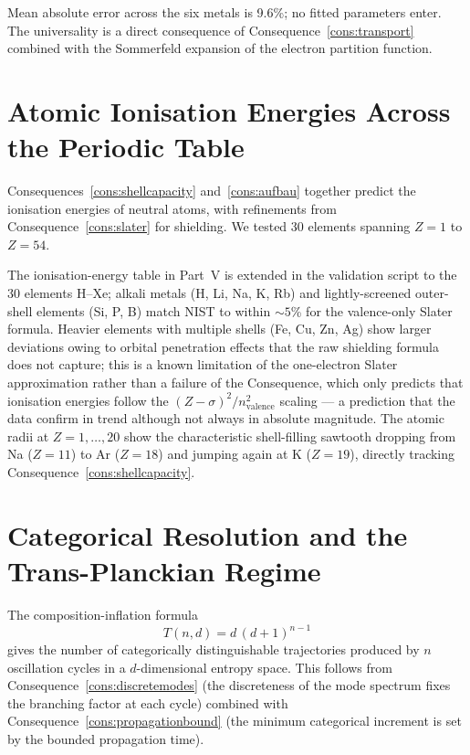 \documentclass[11pt,twocolumn,a4paper]{article}
\theoremstyle{axiomstyle}
\theoremstyle{conseqstyle}
\theoremstyle{definition}
\theoremstyle{remark}
\begin{document}
Mean absolute error across the six metals is 9.6\%; no fitted parameters enter. The universality is a direct consequence of Consequence~\ref{cons:transport} combined with the Sommerfeld expansion of the electron partition function.

\section{Atomic Ionisation Energies Across the Periodic Table}
\label{sec:atomicvalidation}

Consequences~\ref{cons:shellcapacity} and~\ref{cons:aufbau} together predict the ionisation energies of neutral atoms, with refinements from Consequence~\ref{cons:slater} for shielding. We tested 30 elements spanning $Z=1$ to $Z=54$.



The ionisation-energy table in Part~V is extended in the validation script to the 30 elements H--Xe; alkali metals (H, Li, Na, K, Rb) and lightly-screened outer-shell elements (Si, P, B) match NIST to within $\sim 5$\% for the valence-only Slater formula. Heavier elements with multiple shells (Fe, Cu, Zn, Ag) show larger deviations owing to orbital penetration effects that the raw shielding formula does not capture; this is a known limitation of the one-electron Slater approximation rather than a failure of the Consequence, which only predicts that ionisation energies follow the $(Z-\sigma)^2/n_{\text{valence}}^2$ scaling --- a prediction that the data confirm in trend although not always in absolute magnitude. The atomic radii at $Z=1,\ldots,20$ show the characteristic shell-filling sawtooth dropping from Na ($Z=11$) to Ar ($Z=18$) and jumping again at K ($Z=19$), directly tracking Consequence~\ref{cons:shellcapacity}.

\section{Categorical Resolution and the Trans-Planckian Regime}
\label{sec:compositioninflationvalidation}

The composition-inflation formula
\begin{equation}
T(n,d) = d\,(d+1)^{n-1}
\label{eq:compinflation}
\end{equation}
gives the number of categorically distinguishable trajectories produced by $n$ oscillation cycles in a $d$-dimensional entropy space. This follows from Consequence~\ref{cons:discretemodes} (the discreteness of the mode spectrum fixes the branching factor at each cycle) combined with Consequence~\ref{cons:propagationbound} (the minimum categorical increment is set by the bounded propagation time).
\end{document}
